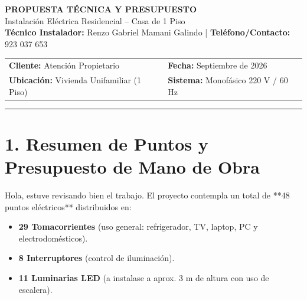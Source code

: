 \documentclass[11pt,a4paper]{article}
\begin{document}
\pagestyle{empty}

\begin{tcolorbox}[colback=DarkBlue,colframe=DarkBlue,arc=4pt]
    \color{white}
    \centering
    {\Huge \textbf{PROPUESTA TÉCNICA Y PRESUPUESTO}}\\[0.2cm]
    {\Large Instalación Eléctrica Residencial -- Casa de 1 Piso}\\[0.1cm]
    \small \textbf{Técnico Instalador:} Renzo Gabriel Mamani Galindo | \textbf{Teléfono/Contacto:} 923 037 653
\end{tcolorbox}

\vspace{0.3cm}

\begin{tabularx}{\textwidth}{X X}
    \textbf{Cliente:} Atención Propietario & \textbf{Fecha:} Septiembre de 2026 \\
    \textbf{Ubicación:} Vivienda Unifamiliar (1 Piso) & \textbf{Sistema:} Monofásico 220 V / 60 Hz \\
\end{tabularx}

\vspace{0.3cm}
\hrule

\section*{1. Resumen de Puntos y Presupuesto de Mano de Obra}

Hola, estuve revisando bien el trabajo. El proyecto contempla un total de **48 puntos eléctricos** distribuidos en:
\begin{itemize}
    \item \textbf{29 Tomacorrientes} (uso general: refrigerador, TV, laptop, PC y electrodomésticos).
    \item \textbf{8 Interruptores} (control de iluminación).
    \item \textbf{11 Luminarias LED} (a instalase a aprox. 3 m de altura con uso de escalera).
\end{itemize}
\end{document}

